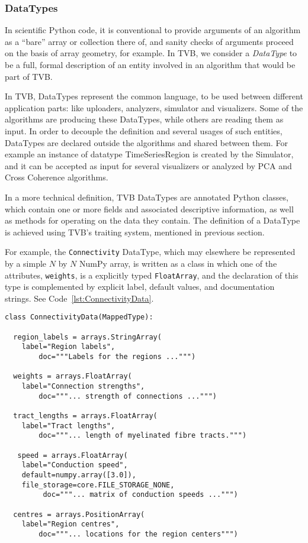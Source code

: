 	\subsubsection{DataTypes}
In scientific Python code, it is conventional to provide arguments
of an algorithm as a ``bare'' array or collection there of, and sanity
checks of arguments proceed on the basis of array geometry, for example.
In TVB, we consider a \textit{DataType} to be a full, formal description of 
an entity involved in an algorithm that would be part of TVB. 

In TVB, DataTypes represent the common language, to be used between different
application parts: like uploaders, analyzers, simulator and visualizers.
Some of the algorithms are producing these DataTypes, while others are reading
them as input.  In order to decouple the definition and several usages of such
entities, DataTypes are declared outside the algorithms and shared between them.
For example an instance of datatype TimeSeriesRegion is created by the
Simulator, and it can be accepted as input for several visualizers or analyzed
by PCA and Cross Coherence algorithms.

In a more technical definition, TVB DataTypes are annotated Python classes, which
contain one or more fields and associated descriptive information, as
well as methods for operating on the data they contain. The definition of a
DataType is achieved using TVB's traiting system, mentioned in previous section.

For example, the \texttt{Connectivity} DataType, which may elsewhere
be represented by a simple $N$ by $N$ NumPy array, is written as a class
in which one of the attributes, \texttt{weights}, is a explicitly typed 
\texttt{FloatArray}, and the declaration of this type is complemented by
explicit label, default values, and documentation strings. See
Code~\ref{lst:ConnectivityData}.

\begin{lstlisting}[caption={The COnnectivityData listing},
                   label={lst:ConnectivityData}]
class ConnectivityData(MappedType):

  region_labels = arrays.StringArray( 
	label="Region labels", 
        doc="""Labels for the regions ...""")

  weights = arrays.FloatArray( 
	label="Connection strengths",
        doc="""... strength of connections ...""")

  tract_lengths = arrays.FloatArray( 
	label="Tract lengths",
        doc="""... length of myelinated fibre tracts.""")

   speed = arrays.FloatArray( 
	label="Conduction speed", 
	default=numpy.array([3.0]), 
	file_storage=core.FILE_STORAGE_NONE,
         doc="""... matrix of conduction speeds ...""")

  centres = arrays.PositionArray( 
	label="Region centres",
        doc="""... locations for the region centers""")
\end{lstlisting}
	

